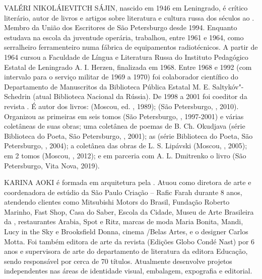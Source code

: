 \medskip

\noindent{}VALÉRI NIKOLÁIEVITCH SÁJIN, nascido em 1946 em Leningrado, é crítico
literário, autor de livros e artigos sobre literatura e cultura russa
dos séculos  ao .
Membro da União dos Escritores de São
Petersburgo desde 1994. Enquanto estudava na escola da juventude
operária, trabalhou, entre 1961 e 1964, como serralheiro ferramenteiro
numa fábrica de equipamentos radiotécnicos. A partir de 1964 cursou a
Faculdade de Língua e Literatura Russa do Instituto Pedagógico Estatal
de Leningrado A. I. Herzen, finalizada em 1968. Entre 1968 e 1992 (com
intervalo para o serviço militar de 1969 a 1970) foi colaborador
científico do Departamento de Manuscritos da Biblioteca Pública Estatal
M. E. Saltykóv"-Schedrin (atual Biblioteca Nacional da Rússia). De 1998 a
2001 foi coeditor da revista {}. É autor dos livros: {} (Moscou, ed.
{}, 1989); {} (São Petersburgo, {}, 2010). Organizou as
primeiras {} em seis tomos (São
Petersburgo, {}, 1997-2001) e várias
coletâneas de suas obras; uma coletânea de poemas de B. Ch. Okudjava
(série Biblioteca do Poeta, São Petersburgo, {}, 2001); as {} (série
Biblioteca do Poeta, São Petersburgo, {},
2004); a coletânea das obras de L. S. Lipávski {}
(Moscou, {}, 2005); {} em
2 tomos (Moscou, {}, 2012); e em
parceria com A. L. Dmitrenko o livro {} (São Petersburgo,
Vita Nova, 2019).

\medskip

\noindent{}KARINA AOKI é formada em arquitetura pela . Atuou como diretora de arte e coordenadora de estúdio da São Paulo Criação – Rafic Farah
durante 8 anos, atendendo clientes como Mitsubishi Motors do Brasil,
Fundação Roberto Marinho, Fast Shop, Casa do Saber, Escola da Cidade,
Museu de Arte Brasileira da , restaurantes Arabia, Spot e Ritz,
marcas de moda Maria Bonita, Mandi, Lucy in the Sky e Brooksfield Donna,
cinema /Belas Artes, e o designer Carlos Motta. Foi também editora
de arte da revista {} (Edições Globo Condé Nast) por 6 anos e
supervisora de arte do departamento de literatura da editora 
Educação, sendo responsável por cerca de 70 títulos. Atualmente
desenvolve projetos independentes nas áreas de identidade visual,
embalagem, expografia e editorial.

